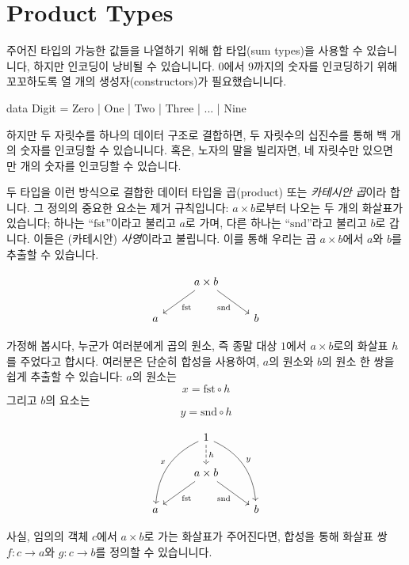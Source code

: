 \documentclass[DaoFP]{subfiles}
\begin{document}
\setcounter{chapter}{4}

\chapter{Product Types}

주어진 타입의 가능한 값들을 나열하기 위해 합 타입(sum types)을 사용할 수 있습니니다, 하지만 인코딩이 낭비될 수 있습니니다. 0에서 9까지의 숫자를 인코딩하기 위해 꼬꼬하도록 열 개의 생성자(constructors)가 필요했습니니다.
\begin{haskell}
data Digit = Zero | One | Two | Three | ... | Nine
\end{haskell}
하지만 두 자릿수를 하나의 데이터 구조로 결합하면, 두 자릿수의 십진수를 통해 백 개의 숫자를 인코딩할 수 있습니니다. 혹은, 노자의 말을 빌리자면, 네 자릿수만 있으면 만 개의 숫자를 인코딩할 수 있습니다.

두 타입을 이런 방식으로 결합한 데이터 타입을 곱(product) 또는 \emph{카테시안 곱}이라 합니다. 그 정의의 중요한 요소는 제거 규칙입니다: $a \times b$로부터 나오는 두 개의 화살표가 있습니다; 하나는 ``$\text{fst}$''이라고 불리고 $a$로 가며, 다른 하나는 ``$\text{snd}$''라고 불리고 $b$로 갑니다. 이들은 (카테시안) \emph{사영}이라고 불립니다. 이를 통해 우리는 곱 $a \times b$에서 $a$와 $b$를 추출할 수 있습니다.

\[
 \begin{tikzcd}
& a \times b
 \arrow[dl,  "\text{fst}"]
 \arrow[dr,   "\text{snd}"']
\\
a && b
 \end{tikzcd}
\]

가정해 봅시다, 누군가 여러분에게 곱의 원소, 즉 종말 대상 $1$에서 $a \times b$로의 화살표 $h$를 주었다고 합시다. 여러분은 단순히 합성을 사용하여, $a$의 원소와 $b$의 원소 한 쌍을 쉽게 추출할 수 있습니다: $a$의 원소는
\[x = \text{fst} \circ h \]
그리고 $b$의 요소는
\[y = \text{snd} \circ h \]

\[
 \begin{tikzcd}
 & 1
\arrow[d, dashed, "h"]
 \arrow[ddl, bend right, "x"']
 \arrow[ddr, bend left, "y"]
\\
&a \times b
 \arrow[dl,  "\text{fst}"]
 \arrow[dr,   "\text{snd}"']
\\
a && b
 \end{tikzcd}
\]

사실, 임의의 객체 $c$에서 $a \times b$로 가는 화살표가 주어진다면, 합성을 통해 화살표 쌍 $f \colon c \to a$와 $g \colon c \to b$를 정의할 수 있습니니다.
\end{document}
